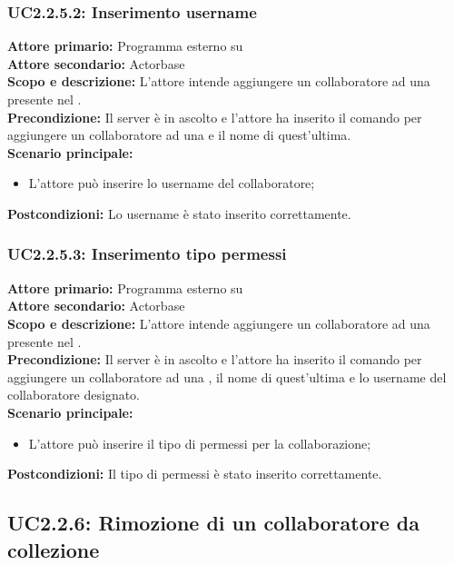 \documentclass{scalatekids-article}
\begin{document}
\subsubsection{UC2.2.5.2: Inserimento username}

\textbf{Attore primario:} Programma esterno su \\
\textbf{Attore secondario:} Actorbase\\
\textbf{Scopo e descrizione:} L’attore intende aggiungere un collaboratore ad una  presente nel .\\
\textbf{Precondizione:} Il server è in ascolto e l’attore ha inserito il comando per aggiungere un collaboratore ad una  e il nome di quest'ultima.\\
\textbf{Scenario principale:}
\begin{itemize}
\item L'attore può inserire lo username del collaboratore;
\end{itemize}
\textbf{Postcondizioni:} Lo username è stato inserito correttamente.

\subsubsection{UC2.2.5.3: Inserimento tipo permessi}

\textbf{Attore primario:} Programma esterno su \\
\textbf{Attore secondario:} Actorbase\\
\textbf{Scopo e descrizione:} L’attore intende aggiungere un collaboratore ad una  presente nel .\\
\textbf{Precondizione:} Il server è in ascolto e l’attore ha inserito il comando per aggiungere un collaboratore ad una , il nome di quest'ultima e lo username del collaboratore designato.\\
\textbf{Scenario principale:}
\begin{itemize}
\item L'attore può inserire il tipo di permessi per la collaborazione;
\end{itemize}
\textbf{Postcondizioni:} Il tipo di permessi è stato inserito correttamente.

\subsection{UC2.2.6: Rimozione di un collaboratore da collezione}
\end{document}
